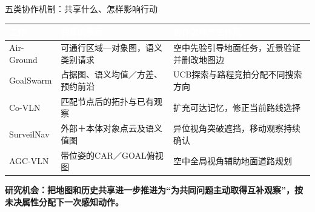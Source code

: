 \documentclass[aspectratio=169,10pt]{beamer}
\def\slidesource{}
\newcommand{\takeaway}[1]{\par\begin{takebox}\fontsize{9.1}{11.5}\selectfont\bfseries\color{navy}#1\end{takebox}}
\newcommand{\thd}[1]{\textcolor{white}{\bfseries #1}}
\begin{document}
\begin{frame}[t,label=external]{五类协作机制：共享什么、怎样影响行动}
\relax
{\fontsize{8.5}{10.8}\selectfont{}
\begin{tabularx}{\linewidth}{@{}Y{0.65}Y{1.15}Y{1.2}@{}}\toprule{}\thd{工作} & \thd{共享的表示} & \thd{协作怎样产生作用}\\\midrule
Air-Ground & 可通行区域—对象图，语义类别请求 & 空中先验引导地面任务，近景验证并删改地图边\\
GoalSwarm & 占据图、语义均值／方差、预约前沿 & UCB探索与路程竞拍分配不同搜索方向\\
Co-VLN & 匹配节点后的拓扑与已有观察 & 扩充可达记忆，修正当前路线选择\\
SurveilNav & 外部＋本体对象点云及语义值图 & 异位视角突破遮挡，移动观察持续确认\\
AGC-VLN & 带位姿的CAR／GOAL俯视图 & 空中全局视角辅助地面道路规划\\
\bottomrule\end{tabularx}\par}
\takeaway{研究机会：把地图和历史共享进一步推进为“为共同问题主动取得互补观察”，按未决属性分配下一次感知动作。}
\end{frame}
\gdef\slidesource{\href{https://arxiv.org/html/2502.18041v7}{[1] OpenFly}；\href{https://arxiv.org/html/2602.00708v2}{[7] USS-Nav}；\href{https://arxiv.org/html/2606.14772v1}{[12] ScoutVLA}；\href{https://arxiv.org/html/2609.39763v1}{[20] DiffWAM}；\href{https://arxiv.org/html/2610.25407v1}{[24] AeroDASH}；\href{https://arxiv.org/html/2603.12908v2}{[25] GoalSwarm}；\href{https://arxiv.org/html/2607.18060v3}{[29] RoboHarness（策略编排）} · 本报告综合分析}
\end{document}
